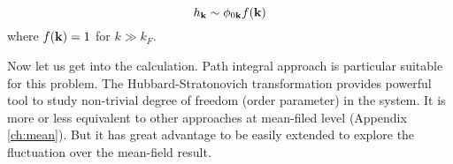 \begin{equation}\label{eq:pathInt2:hphif}
h_{\mathbf{k}}\sim\phi_{0\mathbf{k}}f(\mathbf{k})
\end{equation}
 where $f(\mathbf{k})=1$ for $k\gg{k_{F}}$.  

%
% 
%

Now let us get into the  calculation.  Path integral approach is particular suitable for this problem.   The Hubbard-Stratonovich transformation provides powerful tool to study non-trivial degree of freedom (order parameter) in the system.  It is more or less equivalent to other approaches at mean-filed level (Appendix \ref{ch:mean}). But it has great advantage to be easily extended to explore the fluctuation over the mean-field result.  


